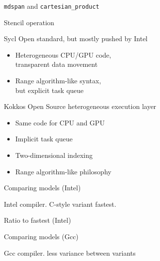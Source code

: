 \documentclass[10pt]{beamer}
\begin{document}
\begin{frame}[containsverbatim]{\texttt{mdspan} and \texttt{cartesian\_product}}
\end{frame}

\begin{frame}[containsverbatim]{Stencil operation}
\end{frame}

\begin{frame}[containsverbatim]{Sycl}
  Open standard, but mostly pushed by Intel
  \begin{itemize}
  \item Heterogeneous CPU/GPU code,\\
    transparent data movement
  \item Range algorithm-like syntax,\\
    but explicit task queue
  \end{itemize}
\end{frame}

\begin{frame}[containsverbatim]{Kokkos}
  Open Source heterogeneous execution layer
  \begin{itemize}
  \item Same code for CPU and GPU
  \item Implicit task queue
  \item Two-dimensional indexing
  \item Range algorithm-like philosophy
  \end{itemize}
\end{frame}

\begin{frame}[containsverbatim]{Comparing models (Intel)}
  

  Intel compiler. C-style variant fastest.
\end{frame}

\begin{frame}[containsverbatim]{Ratio to fastest (Intel)}
  
\end{frame}

\begin{frame}[containsverbatim]{Comparing models (Gcc)}
  

  Gcc compiler. less variance between variants
\end{frame}
\end{document}
